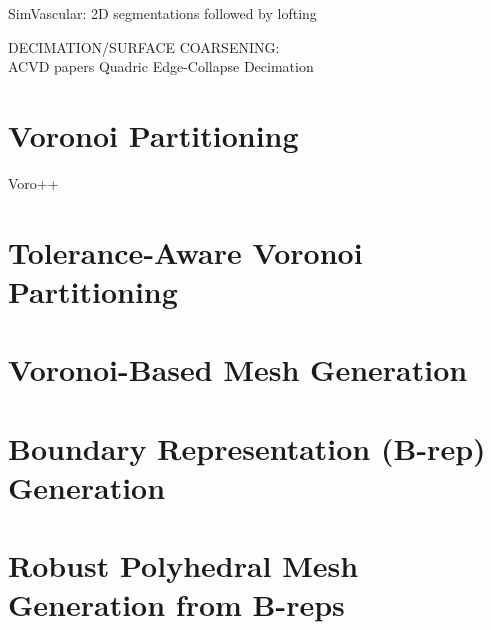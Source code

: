 SimVascular: 2D segmentations followed by lofting



DECIMATION/SURFACE COARSENING:\\
ACVD papers
Quadric Edge-Collapse Decimation

\section{Voronoi Partitioning}
\label{Voronoi Partitioning}
Voro++

\section{Tolerance-Aware Voronoi Partitioning}
\label{Tolerance-Aware Voronoi Partitioning}
\section{Voronoi-Based Mesh Generation}
\label{Voronoi-Based Mesh Generation}
\section{Boundary Representation (B-rep) Generation}
\label{Boundary Representation (B-rep) Generation}
\section{Robust Polyhedral Mesh Generation from B-reps}
\label{Robust Polyhedral Mesh Generation from B-reps}
